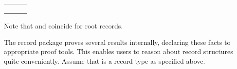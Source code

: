 \begin{isabellebody}
\begin{isamarkuptext}
  \medskip
  \begin{tabular}{lll}
    \isa{{\isachardoublequote}t{\isachardot}fields{\isachardoublequote}} & \isa{{\isachardoublequote}{\isacharcolon}{\isacharcolon}{\isachardoublequote}} & \isa{{\isachardoublequote}{\isasymsigma}\isactrlsub {\isadigit{1}}\ {\isasymRightarrow}\ {\isasymdots}\ {\isasymsigma}\isactrlsub n\ {\isasymRightarrow}\ {\isasymlparr}\isactrlvec c\ {\isacharcolon}{\isacharcolon}\ \isactrlvec {\isasymsigma}{\isasymrparr}{\isachardoublequote}} \\
    \isa{{\isachardoublequote}t{\isachardot}extend{\isachardoublequote}} & \isa{{\isachardoublequote}{\isacharcolon}{\isacharcolon}{\isachardoublequote}} & \isa{{\isachardoublequote}{\isasymlparr}\isactrlvec b\ {\isacharcolon}{\isacharcolon}\ \isactrlvec {\isasymrho}{\isacharcomma}\ \isactrlvec c\ {\isacharcolon}{\isacharcolon}\ \isactrlvec {\isasymsigma}{\isasymrparr}\ {\isasymRightarrow}\ {\isasymzeta}\ {\isasymRightarrow}\ {\isasymlparr}\isactrlvec b\ {\isacharcolon}{\isacharcolon}\ \isactrlvec {\isasymrho}{\isacharcomma}\ \isactrlvec c\ {\isacharcolon}{\isacharcolon}\ \isactrlvec {\isasymsigma}{\isacharcomma}\ {\isasymdots}\ {\isacharcolon}{\isacharcolon}\ {\isasymzeta}{\isasymrparr}{\isachardoublequote}} \\
    \isa{{\isachardoublequote}t{\isachardot}truncate{\isachardoublequote}} & \isa{{\isachardoublequote}{\isacharcolon}{\isacharcolon}{\isachardoublequote}} & \isa{{\isachardoublequote}{\isasymlparr}\isactrlvec b\ {\isacharcolon}{\isacharcolon}\ \isactrlvec {\isasymrho}{\isacharcomma}\ \isactrlvec c\ {\isacharcolon}{\isacharcolon}\ \isactrlvec {\isasymsigma}{\isacharcomma}\ {\isasymdots}\ {\isacharcolon}{\isacharcolon}\ {\isasymzeta}{\isasymrparr}\ {\isasymRightarrow}\ {\isasymlparr}\isactrlvec b\ {\isacharcolon}{\isacharcolon}\ \isactrlvec {\isasymrho}{\isacharcomma}\ \isactrlvec c\ {\isacharcolon}{\isacharcolon}\ \isactrlvec {\isasymsigma}{\isasymrparr}{\isachardoublequote}} \\
  \end{tabular}
  \medskip

  \noindent Note that  and  coincide
  for root records.%
\end{isamarkuptext}%
\isamarkuptrue%
%
\isamarkuptrue%
%
\begin{isamarkuptext}%
The record package proves several results internally, declaring
  these facts to appropriate proof tools.  This enables users to
  reason about record structures quite conveniently.  Assume that
   is a record type as specified above.


\end{isamarkuptext}
\end{isabellebody}
